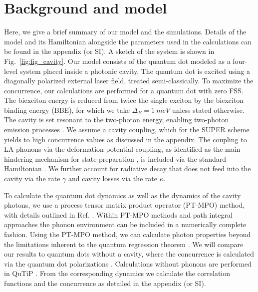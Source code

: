 \documentclass[%
 reprint,superscriptaddress,
 amsmath,amssymb,
 aps]{revtex4-2}
\begin{document}
\section{Background and model}
Here, we give a brief summary of our model and the simulations. Details of the model and its Hamiltonian alongside the parameters used in the calculations can be found in the appendix (or SI). A sketch of the system is shown in Fig.~\ref{fig:fig_cavity}.
Our model consists of the quantum dot modeled as a four-level system placed inside a photonic cavity. The quantum dot is excited using a diagonally polarized external laser field, treated semi-classically. To maximize the concurrence, our calculations are performed for a quantum dot with zero FSS. The biexciton energy is reduced from twice the single exciton by the biexciton binding energy (BBE), for which we take $\Delta_B=\SI{1}{meV}$ unless stated otherwise. The cavity is set resonant to the two-photon energy, enabling two-photon emission processes \cite{ota2011spontaneous}. We assume a cavity coupling, which for the SUPER scheme yields to high concurrence values as discussed in the appendix. The coupling to LA phonons via the deformation potential coupling, as identified as the main hindering mechanism for state preparation \cite{ramsay2010phonon,luker2019review}, is included via the standard Hamiltonian \cite{reiter2019distinctive}. We further account for radiative decay that does not feed into the cavity via the rate $\gamma$ and cavity losses via the rate $\kappa$. 

To calculate the quantum dot dynamics as well as the dynamics of the cavity photons, we use a process tensor matrix product operator (PT-MPO) method, with details outlined in Ref. \cite{cygorek2022simulation}. Within PT-MPO methods \cite{strathearn2018efficient,jorgensen2019exploiting,pollock2018non,cygorek2022simulation,cygorek2023sublinear} and path integral approaches \cite{Seidelmann2023,cosacchi2018pathintegral} the phonon environment can be included in a numerically complete fashion. Using the PT-MPO method, we can calculate photon properties beyond the limitations inherent to the quantum regression theorem \cite{cosacchi2021accuracy}. We will compare our results to quantum dots without a cavity, where the concurrence is calculated via the quantum dot polarizations \cite{seidelmann2022two}. Calculations without phonons are performed in QuTiP \cite{johansson2012qutip,johansson2013qutip}. From the corresponding dynamics we calculate the correlation functions and the concurrence as detailed in the appendix (or SI).
\end{document}
